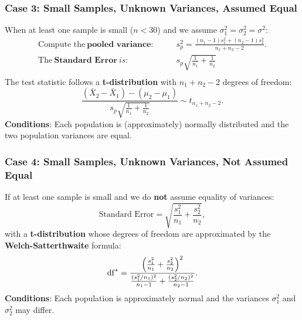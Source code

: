 \documentclass[10pt]{extarticle}
\begin{document}
\subsubsection{Case 3: Small Samples, Unknown Variances, Assumed Equal}
When at least one sample is small ($n < 30$) and we assume $\sigma_1^2 = \sigma_2^2 = \sigma^2$:
\begin{align*}
    \text{Compute the} \ \textbf{pooled variance}: & \quad\quad s_p^2 = \frac{(n_1 - 1)s_1^2 + (n_2 - 1)s_2^2}{n_1 + n_2 - 2}. \\
    \text{The} \ \textbf{Standard Error} \ is:     & \quad\quad s_p \sqrt{\frac{1}{n_1} + \frac{1}{n_2}}                       \\
\end{align*}
The test statistic follows a \textbf{t-distribution} with $n_1 + n_2 - 2$ degrees of freedom:
$$\frac{(\bar{X}_2 - \bar{X}_1) - (\mu_2 - \mu_1)}{s_p \sqrt{\frac{1}{n_1} + \frac{1}{n_2}}} \sim t_{n_1 + n_2 - 2}.
$$
\textbf{Conditions}: Each population is (approximately) normally distributed and the two population variances are equal.

\subsubsection{Case 4: Small Samples, Unknown Variances, Not Assumed Equal}
If at least one sample is small and we do \textbf{not} assume equality of variances:
$$
    \text{Standard Error} = \sqrt{\frac{s_1^2}{n_1} + \frac{s_2^2}{n_2}},
$$
with a \textbf{t-distribution} whose degrees of freedom are approximated by the \textbf{Welch-Satterthwaite} formula:
$$
    \mathrm{df}^* = \frac{\Bigl(\frac{s_1^2}{n_1} + \frac{s_2^2}{n_2}\Bigr)^2}{\frac{(s_1^2/n_1)^2}{n_1 - 1} + \frac{(s_2^2/n_2)^2}{n_2 - 1}}.
$$
\textbf{Conditions}: Each population is approximately normal and the variances $\sigma_1^2$ and $\sigma_2^2$ may differ.
\end{document}
